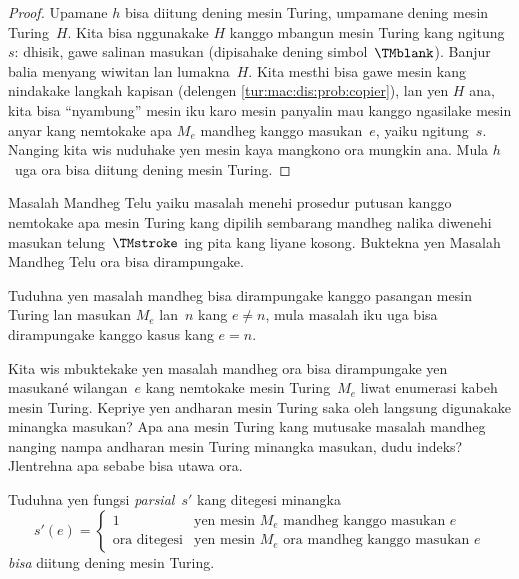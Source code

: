 \documentclass[../../../include/open-logic-section]{subfiles}
\begin{document}
\begin{proof}
Upamane $h$ bisa diitung dening mesin Turing,
umpamane dening mesin Turing~$H$. Kita bisa
nggunakake $H$ kanggo mbangun mesin Turing
kang ngitung~$s$: dhisik, gawe salinan masukan
(dipisahake dening simbol~$\TMblank$). Banjur
balia menyang wiwitan lan lumakna~$H$.
Kita mesthi bisa gawe mesin kang nindakake
langkah kapisan (delengen
\cref{tur:mac:dis:prob:copier}), lan yen $H$
ana, kita bisa ``nyambung'' mesin iku
karo mesin panyalin mau kanggo ngasilake
mesin anyar kang nemtokake apa $M_e$
mandheg kanggo masukan~$e$, yaiku ngitung~$s$.
Nanging kita wis nuduhake yen mesin kaya
mangkono ora mungkin ana. Mula $h$~uga
ora bisa diitung dening mesin Turing.
\end{proof}

\begin{prob}
Masalah Mandheg Telu yaiku masalah
menehi prosedur putusan kanggo nemtokake apa
mesin Turing kang dipilih sembarang mandheg
nalika diwenehi masukan telung~$\TMstroke$
ing pita kang liyane kosong. Buktekna
yen Masalah Mandheg Telu ora bisa dirampungake.
\end{prob}

\begin{prob}
Tuduhna yen masalah mandheg bisa dirampungake
kanggo pasangan mesin Turing lan masukan $M_e$
lan~$n$ kang $e \neq n$, mula masalah iku
uga bisa dirampungake kanggo kasus kang
$e = n$.
\end{prob}

\begin{prob}
Kita wis mbuktekake yen masalah mandheg
ora bisa dirampungake yen masukané wilangan~$e$
kang nemtokake mesin Turing~$M_e$ liwat
enumerasi kabeh mesin Turing. Kepriye yen
andharan mesin Turing saka
 oleh langsung
digunakake minangka masukan? Apa ana mesin
Turing kang mutusake masalah mandheg nanging
nampa andharan mesin Turing minangka masukan,
dudu indeks? Jlentrehna apa sebabe bisa
utawa ora.
\end{prob}

\begin{prob} Tuduhna yen fungsi \emph{parsial}~$s'$ kang ditegesi minangka
  \[
  s'(e) =
  \begin{cases}
    \text{1} & \text{yen mesin~$M_e$ mandheg kanggo masukan $e$}\\
    \text{ora ditegesi} & \text{yen mesin~$M_e$ ora mandheg kanggo masukan $e$}
  \end{cases}
  \]
  \emph{bisa} diitung dening mesin Turing.
\end{prob}
\end{document}
